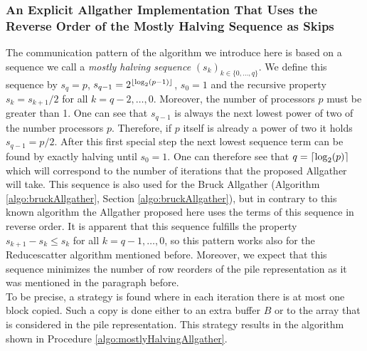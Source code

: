 \subsubsection{An Explicit Allgather Implementation That Uses the Reverse Order of the Mostly Halving Sequence as Skips}
The communication pattern of the algorithm we introduce here is based on a sequence we call a \emph{mostly halving sequence} $(s_k)_{k\in \{0,\dots, q\}}$. We define this sequence by $s_q=p$, $s_{q-1}=2^{\lfloor\log_2(p-1)\rfloor}$, $s_0=1$ and the recursive property $s_k = s_{k+1}/2$ for all $k=q-2, \dots, 0$. Moreover, the number of processors $p$ must be greater than 1. One can see that $s_{q-1}$ is always the next lowest power of two of the number processors $p$. Therefore, if $p$ itself is already a power of two it holds $s_{q-1}=p/2$. After this first special step the next lowest sequence term can be found by exactly halving until $s_0=1$. One can therefore see that $q=\lceil\log_2(p)\rceil$ which will correspond to the number of iterations that the proposed Allgather will take. This sequence is also used for the Bruck Allgather (Algorithm \ref{algo:bruckAllgather}, Section \ref{algo:bruckAllgather}), but in contrary to this known algorithm the Allgather proposed here uses the terms of this sequence in reverse order. It is apparent that this sequence fulfills the property $s_{k+1} - s_k \leq s_k$ for all $k=q-1, \dots, 0$, so this pattern works also for the Reducescatter algorithm mentioned before. Moreover, we expect that this sequence minimizes the number of row reorders of the pile representation as it was mentioned in the paragraph before. \\
To be precise, a strategy is found where in each iteration there is at most one block copied. Such a copy is done either to an extra buffer $B$ or to the array that is considered in the pile representation. This strategy results in the algorithm shown in Procedure \ref{algo:mostlyHalvingAllgather}. 
